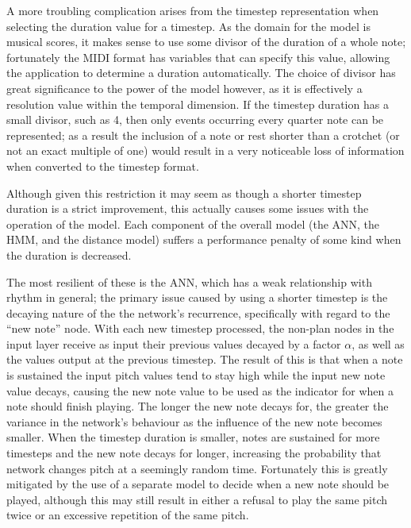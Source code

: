 \documentclass[ author={Stephen Livermore-Tozer},
				supervisor={Dr. Peter Flach},
				degree={MEng},
				title={Performing Algorithmic Co-composition Using Machine Learning},
				subtitle={},
				type={research},
				year={2016} ]{dissertation}
\begin{document}
	A more troubling complication arises from the timestep representation when selecting the duration value for a timestep. As the domain for the model is musical scores, it makes sense to use some divisor of the duration of a whole note; fortunately the MIDI format has variables that can specify this value, allowing the application to determine a duration automatically. The choice of divisor has great significance to the power of the model however, as it is effectively a resolution value within the temporal dimension. If the timestep duration has a small divisor, such as 4, then only events occurring every quarter note can be represented; as a result the inclusion of a note or rest shorter than a crotchet (or not an exact multiple of one) would result in a very noticeable loss of information when converted to the timestep format. 
	
	
	Although given this restriction it may seem as though a shorter timestep duration is a strict improvement, this actually causes some issues with the operation of the model. Each component of the overall model (the ANN, the HMM, and the distance model) suffers a performance penalty of some kind when the duration is decreased.
	
	The most resilient of these is the ANN, which has a weak relationship with rhythm in general; the primary issue caused by using a shorter timestep is the decaying nature of the the network's recurrence, specifically with regard to the ``new note'' node. With each new timestep processed, the non-plan nodes in the input layer receive as input their previous values decayed by a factor $\alpha$, as well as the values output at the previous timestep. The result of this is that when a note is sustained the input pitch values tend to stay high while the input new note value decays, causing the new note value to be used as the indicator for when a note should finish playing. The longer the new note decays for, the greater the variance in the network's behaviour as the influence of the new note becomes smaller. When the timestep duration is smaller, notes are sustained for more timesteps and the new note decays for longer, increasing the probability that network changes pitch at a seemingly random time. Fortunately this is greatly mitigated by the use of a separate model to decide when a new note should be played, although this may still result in either a refusal to play the same pitch twice or an excessive repetition of the same pitch.
	
\end{document}
